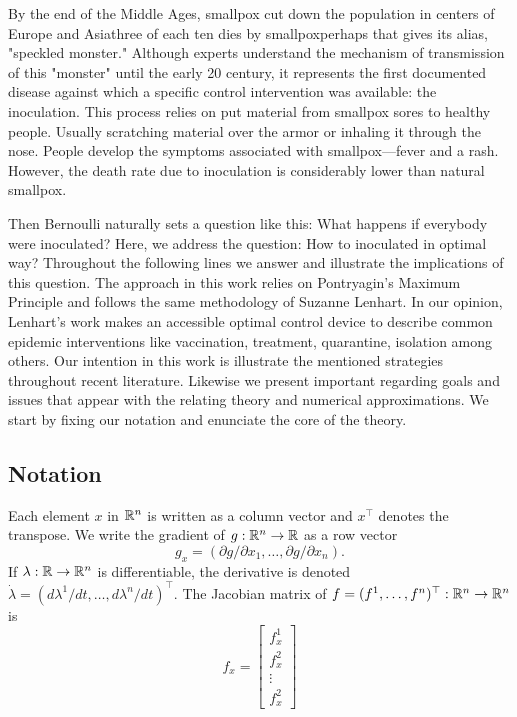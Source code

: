   By the end of the Middle Ages, smallpox cut down the 
population in centers of Europe and Asia\textemdash three of each ten dies by 
smallpox\textemdash perhaps that gives its alias, "speckled monster."  
Although experts understand the mechanism of transmission of this  "monster"
until the early 20  century, it represents the first documented disease
\citep[][]{bernoulli1760essai, bradley1971smallpox, Foppa2017} against which a
specific control intervention was available: the inoculation. This process
relies on put material from smallpox sores to healthy people. Usually scratching
material over the armor or inhaling it through the nose. People develop the
symptoms associated with smallpox---fever and a rash. However, the death rate
due to inoculation is considerably lower than natural smallpox.

  Then Bernoulli naturally sets a question like this: What happens
if everybody were inoculated? Here, we address the question: How to 
inoculated in optimal way? Throughout the following lines we answer and 
illustrate the implications of this question.
The approach in this work relies on Pontryagin's Maximum Principle
\cite{Boltyanski1960} and follows the same methodology of Suzanne Lenhart.
In our opinion, Lenhart's work makes an accessible optimal control device to
describe common epidemic interventions like vaccination, treatment, 
quarantine, isolation among others. Our intention in this work is illustrate 
the mentioned strategies throughout recent literature. Likewise we present 
important regarding goals and issues that appear with the relating theory and 
numerical approximations. We start by fixing our notation and enunciate the core
of the theory.


\subsection*{Notation} Each element $x$ in $\mathbb{R}^n$ is written as a column vector 
and 
$x^\top$ denotes the transpose. We write the gradient of $g:\mathbb{R}^n\to\mathbb{R}$ as a row 
vector 
    \[ g_x =(\partial g/\partial x_1,\ldots, \partial g/\partial x_n). \]
If $\lambda:\mathbb{R}\to\mathbb{R}^n$ is differentiable, the derivative is denoted 
$\dot{\lambda}=(d\lambda^1/dt,\ldots,d\lambda^n/dt)^\top$. The Jacobian matrix 
of $f=(f^1,\ldots,f^n)^\top:\mathbb{R}^n\to\mathbb{R}^n$ is   
\[f_x=
  \begin{bmatrix}
    f^1_x\\
    f^2_x\\
    \vdots \\
    f^2_x
  \end{bmatrix}
 \]
